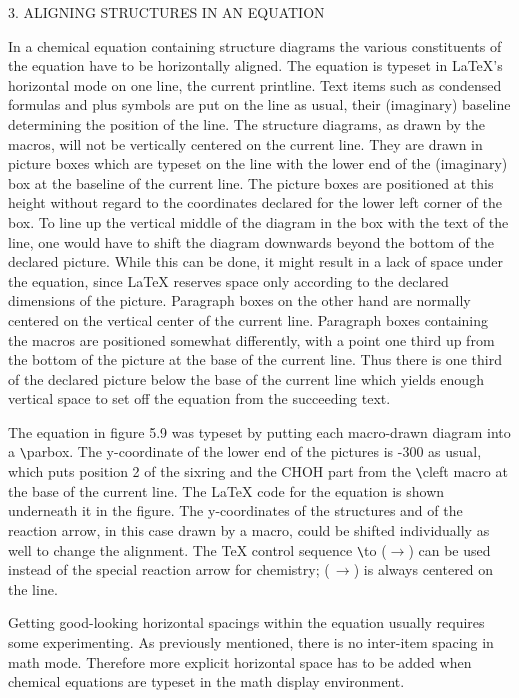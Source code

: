  
 \vspace{\len mm}
 \centerline{3. ALIGNING STRUCTURES IN AN EQUATION}
 \vspace{\len mm}
 In a chemical equation containing structure diagrams the 
 various constituents of the equation have to be horizontally
 aligned. The equation is typeset in LaTeX's horizontal mode
 on one line, the current printline. Text items such as  
 condensed formulas and plus symbols are put on the line
 as usual, their (imaginary) baseline determining the
 position of the line. The structure diagrams, as drawn
 by the macros, will not be vertically centered on the
 current line. They are drawn in picture boxes which are
 typeset on the line with the lower end of the (imaginary)
 box at the baseline of the current line. The picture boxes
 are positioned at this height without regard to the
 coordinates declared for the lower left corner of the
 box. To line up the vertical middle of the diagram in the
 box with the text of the line, one would have to shift the
 diagram downwards beyond the bottom of the declared picture.
 While this can be done, it might result in a lack of space
 under the equation, since LaTeX reserves space only according
 to the declared dimensions of the picture. Paragraph boxes
 on the other hand are normally centered on the vertical
 center of the current line. Paragraph boxes containing
 the macros are positioned somewhat differently, with 
 a point one third up from the bottom of the picture at
 the base of the current line. Thus there is one third of
 the declared picture below the base of the current line 
 which yields enough vertical space to set off the 
 equation from the succeeding text. 
 
 The equation in
 figure 5.9 was typeset by putting each macro-drawn
 diagram into a \verb+\+parbox. The y-coordinate of the
 lower end of the pictures is -300 as usual, which puts
 position 2 of the sixring and the CHOH part from the
 \verb+\+cleft macro at the base of the current line.
 The LaTeX code for the equation is shown underneath it
 in the figure.
 The y-coordinates of the structures and of the reaction
 arrow, in this case drawn by a macro, could be
 shifted individually as well to change the alignment.
 The TeX control sequence \verb+\+to ($\to $) can be used
 instead of the special reaction arrow for chemistry;
 ($\,\to $) is always centered on the line.
 
 Getting good-looking horizontal spacings within the
 equation usually requires some experimenting.
 As previously mentioned, there is no inter-item
 spacing in math mode. Therefore more explicit horizontal
 space has to be added when chemical equations are
 typeset in the math display environment.

